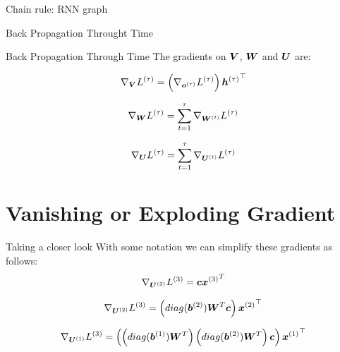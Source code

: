 \documentclass[10pt]{beamer}
\begin{document}
\begin{frame}{Chain rule: RNN graph}

\end{frame}


\begin{frame}{Back Propagation Throught Time}

\end{frame}

\begin{frame}{Back Propagation Through Time}
The gradients on $\bm{V}$, $\bm{W}$ and $\bm{U}$ are:
\vspace{0.3cm}
\Large{
\begin{equation*}
\nabla_{\bm{V}} {L^{(\tau)}} = \left({\nabla_{\bm{o}^{(\tau)}} {L^{(\tau)}}}\right){\bm{h}^{(\tau)}}^{\top} 
\end{equation*}


\begin{equation*}
\nabla_{\bm{W}} {L^{(\tau)}} = \sum_{t=1}^{\tau}\nabla_{\bm{W}^{(t)}} {L^{(\tau)}}
\end{equation*}

\begin{equation*}
\nabla_{\bm{U}} {L^{(\tau)}} = \sum_{t=1}^{\tau}\nabla_{\bm{U}^{(t)}} {L^{(\tau)}}
\end{equation*}
}
\end{frame}

\section{Vanishing or Exploding Gradient}


\begin{frame}{Taking a closer look}
With some notation we can simplify these gradients as follows:
\begin{eqnarray*}
\nabla_{\bm{U}^{(3)}} {L^{(3)}} = \bm{c}{\bm{x}^{(3)}}^{T}
\end{eqnarray*}

\begin{eqnarray*}
\nabla_{\bm{U}^{(2)}} {L^{(3)}} = \left({diag(\bm{b}^{(2)}) \bm{W}^{T} \bm{c}}\right){\bm{x}^{(2)}}^{\top}
\end{eqnarray*}

\begin{eqnarray*}
\nabla_{\bm{U}^{(1)}} {L^{(3)}} = \left({\left(diag(\bm{b}^{(1)}) \bm{W}^{T} \right) \left(diag(\bm{b}^{(2)}) \bm{W}^{T}\right) \bm{c}}\right){\bm{x}^{(1)}}^{\top}
\end{eqnarray*}
\end{frame}
\end{document}
